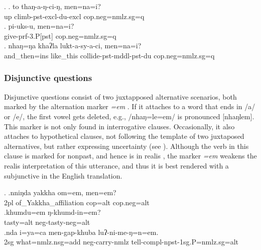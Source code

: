 \ex. \ag.  to  thaŋ-a-ŋ-ci-ŋ,   men=na=i?\\
up climb{\sc -pst-excl-du-excl}  {\sc cop.neg=nmlz.sg=q}\\
 
\bg. pi-uks-u,            men=na=i?\\
give{\sc -prf-3.P[pst]}  {\sc cop.neg=nmlz.sg=q}\\
 
  \bg.    nhaŋ=ŋa      khaʔla   lukt-a-sy-a-ci,    men=na=i?\\
  and\_then{\sc =ins} like\_this collide{\sc -pst-mddl-pst-du} {\sc cop.neg=nmlz.sg=q} \\
   
  
  
\subsubsection{Disjunctive questions}
 
 Disjunctive questions consist of two juxtapposed alternative scenarios, both marked by the alternation marker \emph{=em} \Next. If it attaches to a word that ends in /a/ or /e/, the first vowel gets deleted, e.g., /nhaŋ=le=em/  is pronounced	[nhaŋlem]. This marker is not only found in interrogative clauses. Occasionally, it also attaches to hypothetical clauses, not following the template of two juxtaposed alternatives, but rather expressing uncertainty (see \Next[c]). Although the verb in this clause is marked for nonpast, and hence is in realis , the marker \emph{=em} weakens the realis interpretation of this utterance, and thus it is best rendered with a subjunctive in the English translation.
 
 \ex. \ag.nniŋda yakkha          om=em,    men=em?\\
 {\sc 2pl} of\_Yakkha\_affiliation {\sc cop=alt} {\sc cop.neg=alt}\\
  
 \bg.khumdu=em ŋ-khumd-in=em?\\
 tasty{\sc =alt} {\sc neg-}tasty{\sc -neg=alt}\\
 \bg.nda i=ya=ca men-gap-khuba luʔ-ni-me-ŋ=n=em.\\
 {\sc 2sg} what{\sc =nmlz.nsg=add} {\sc neg-}carry{\sc -nmlz} tell{\sc -compl-npst-1sg.P=nmlz.sg=alt}\\
  
 
